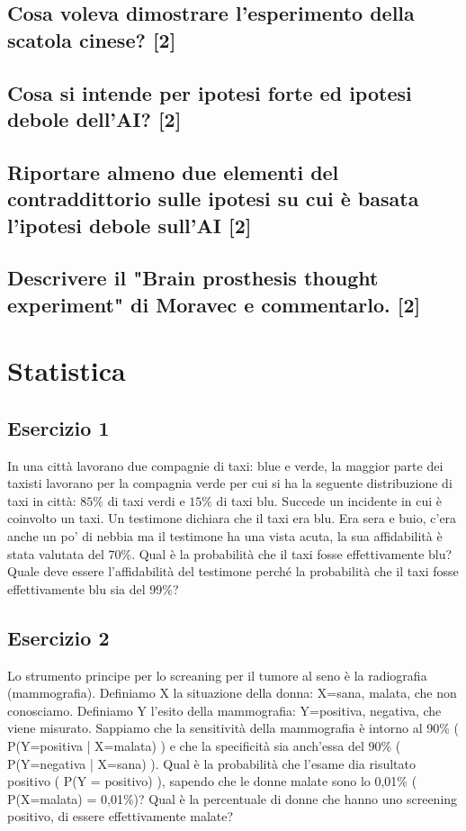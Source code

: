 \documentclass[\main/main.tex]{subfiles}
\begin{document}
\subsection{Cosa voleva dimostrare l'esperimento della scatola cinese? [2]}
\subsection{Cosa si intende per ipotesi forte ed ipotesi debole dell'AI? [2]}
\subsection{Riportare almeno due elementi del contraddittorio sulle ipotesi su cui è basata l'ipotesi debole sull'AI [2]}
\subsection{Descrivere il "Brain prosthesis thought experiment" di Moravec e commentarlo. [2]}

\clearpage
\section{Statistica}

\subsection{Esercizio 1}
In una città lavorano due compagnie di taxi: blue e verde, la maggior parte dei taxisti lavorano per la compagnia verde per cui si ha la seguente distribuzione di taxi in città: $85\%$ di taxi verdi e $15\%$ di taxi blu. Succede un incidente in cui è coinvolto un taxi. Un testimone dichiara che il taxi era blu. Era sera e buio, c'era anche un po' di nebbia ma il testimone ha una vista acuta, la sua affidabilità è stata valutata del $70\%$. Qual è la probabilità che il taxi fosse effettivamente blu? Quale deve essere l'affidabilità del testimone perché la probabilità che il taxi fosse effettivamente blu sia del 99\%? 

\subsection{Esercizio 2}
Lo strumento principe per lo screaning per il tumore al seno è la radiografia (mammografia). Definiamo X la situazione della donna: X={sana, malata}, che non conosciamo. Definiamo Y l'esito della mammografia: Y={positiva, negativa}, che viene misurato. Sappiamo che la sensitività della mammografia è intorno al 90\% ( P(Y=positiva | X=malata) ) e che la specificità sia anch'essa del 90\% ( P(Y=negativa | X=sana) ). Qual è la probabilità che l'esame dia risultato positivo ( P(Y = positivo) ), sapendo che le donne malate sono lo 0,01\% ( P(X=malata) = 0,01\%)? Qual è la percentuale di donne che hanno uno screening positivo, di essere effettivamente malate?
\end{document}
